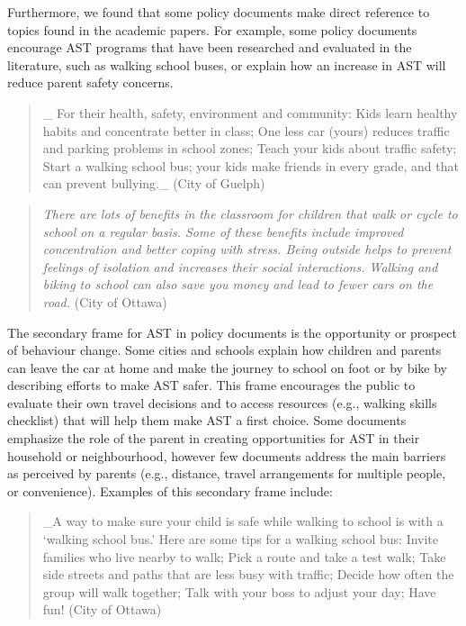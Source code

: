 \documentclass[]{elsarticle} %
\begin{document}
Furthermore, we found that some policy documents make direct reference
to topics found in the academic papers. For example, some policy
documents encourage AST programs that have been researched and evaluated
in the literature, such as walking school buses, or explain how an
increase in AST will reduce parent safety concerns.

\begin{quote}
\_ For their health, safety, environment and community: Kids learn
healthy habits and concentrate better in class; One less car (yours)
reduces traffic and parking problems in school zones; Teach your kids
about traffic safety; Start a walking school bus; your kids make friends
in every grade, and that can prevent bullying.\_ (City of Guelph)
\end{quote}

\begin{quote}
\emph{There are lots of benefits in the classroom for children that walk
or cycle to school on a regular basis. Some of these benefits include
improved concentration and better coping with stress. Being outside
helps to prevent feelings of isolation and increases their social
interactions. Walking and biking to school can also save you money and
lead to fewer cars on the road.} (City of Ottawa)
\end{quote}

The secondary frame for AST in policy documents is the opportunity or
prospect of behaviour change. Some cities and schools explain how
children and parents can leave the car at home and make the journey to
school on foot or by bike by describing efforts to make AST safer. This
frame encourages the public to evaluate their own travel decisions and
to access resources (e.g., walking skills checklist) that will help them
make AST a first choice. Some documents emphasize the role of the parent
in creating opportunities for AST in their household or neighbourhood,
however few documents address the main barriers as perceived by parents
(e.g., distance, travel arrangements for multiple people, or
convenience). Examples of this secondary frame include:

\begin{quote}
\_A way to make sure your child is safe while walking to school is with
a `walking school bus.' Here are some tips for a walking school bus:
Invite families who live nearby to walk; Pick a route and take a test
walk; Take side streets and paths that are less busy with traffic;
Decide how often the group will walk together; Talk with your boss to
adjust your day; Have fun! (City of Ottawa)
\end{quote}
\end{document}
